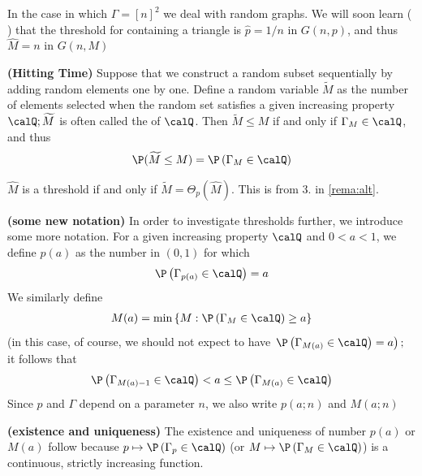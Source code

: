 \documentclass{article}
\newcommand{\bfs}[1]{\textbf{({#1}) }}
\begin{document}
\begin{exma}
In the case in which $\Gamma=[n]^{2}$ we deal with random graphs. We will soon learn (\cite[Theorem 3.4]{janson2011random} ) that the threshold for containing a triangle is $\widehat{p}=1 / n$ in $G (n, p)$, and thus $\widehat{M}=n$ in $G (n, M)$
\end{exma}
\begin{defa}{\bfs{Hitting Time}}
 Suppose that we construct a random subset sequentially by adding random elements one by one. Define a random variable $\widetilde{M}$ as the number of elements selected when the random set  satisfies a given increasing property $\calQ ; \widetilde{M}$ is often called the  of $\calQ$. Then $\widetilde{M} \leq M$ if and only if $\Gamma_{M} \in \calQ$, and thus
\begin{align}
\P (\widetilde{M} \leq M)= \P \left(\Gamma_{M} \in \calQ \right) \label{eq:hit}
\end{align}
\end{defa}
\begin{rema}
$\widehat{M}$ is a threshold if and only if $\widetilde{M}=\Theta_{p}(\widehat{M})$. This is from 3. in \cref{rema:alt}.
\end{rema}
\begin{defa}\bfs{some new notation}
 In order to investigate thresholds further, we introduce some more notation. For a given increasing property $\calQ$ and $0<a<1$, we define $p(a)$ as the number in $(0,1)$ for which
\begin{align*}
\P \left(\Gamma_{p(a)} \in \calQ \right)=a
\end{align*}
 We similarly define
\begin{align*}
M(a)=\min \left\{M: \P \left(\Gamma_{M} \in \calQ \right) \geq a\right\}
\end{align*}
(in this case, of course, we should not expect to have $\left.\P \left(\Gamma_{M(a)} \in \calQ \right)=a\right) ;$ it follows that
\begin{align}
\P \left(\Gamma_{M(a)-1} \in \calQ \right)<a \leq \P \left(\Gamma_{M(a)} \in \calQ \right)\label{eq:ma}
\end{align}
Since $p$ and $\Gamma$ depend on a parameter $n$, we also write $p(a ; n)$ and $M(a ; n)$
\end{defa}
\begin{rema}{\bfs{existence and uniqueness}}
The existence and uniqueness of number $p(a)$ or $M(a)$ follow because $p \mapsto \P \left(\Gamma_{p} \in \calQ \right)$ (or $M \mapsto \P \left(\Gamma_{M} \in \calQ \right)$) is a continuous, strictly increasing function.
\end{rema}
\end{document}
